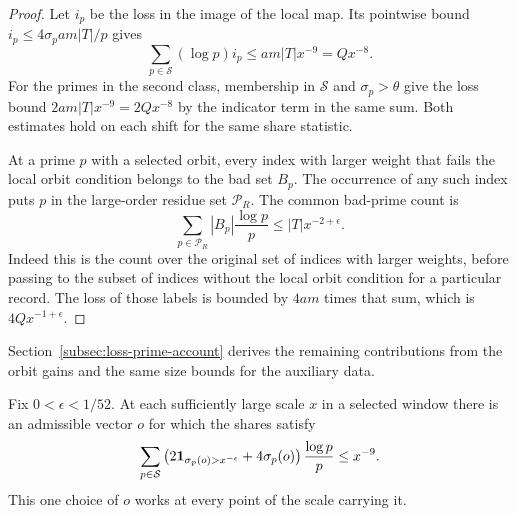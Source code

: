 \begin{proof}
Let \(i_p\) be the loss in the image of the local map. Its pointwise
bound \(i_p\le4\sigma_p a m|T|/p\) gives
\[
 \sum_{p\in\mathcal S}(\log p)i_p
             \le a m|T|x^{-9}=Qx^{-8}.
\]
For the primes in the second class, membership in
\(\mathcal S\) and \(\sigma_p>\theta\) give the loss
bound \(2a m|T|x^{-9}=2Qx^{-8}\) by the indicator
term in the same sum. Both estimates hold on each shift
for the same share statistic.

At a prime \(p\) with a selected orbit, every index with larger
weight that fails the local orbit condition belongs to the bad
set \(B_p\). The occurrence of any such index puts \(p\) in the
large-order residue set \(\mathcal P_R\).
The common bad-prime count is
\[
 \sum_{p\in\mathcal P_R}|B_p|\frac{\log p}{p}\le |T|x^{-2+\epsilon}.
\]
Indeed this is the count over the original set of indices with larger weights,
before passing to the subset of indices without the local orbit condition for a
particular record. The loss of those labels is bounded by
\(4am\) times that sum, which is \(4Qx^{-1+\epsilon}\).
\end{proof}
Section~\ref{subsec:loss-prime-account} derives the remaining
contributions from the orbit gains and the same size bounds for the auxiliary data.
\label{cor:frames-8}



\begin{lemma}\label{lem:one-share-vector}
Fix \(0<\epsilon<1/52\). At each sufficiently large scale \(x\) in a selected window there is an admissible vector \(o\) for which the shares satisfy
\[
 \sum_{p\in\mathcal S}\left(2{\bf1}_{\sigma_p(o)>x^{-\epsilon}}+4\sigma_p(o)\right)\frac{\log p}{p}\le x^{-9}.
\]
This one choice of \(o\) works at every point of the scale carrying it.
\end{lemma}


